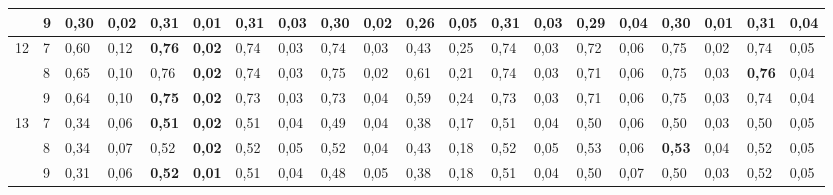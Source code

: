\documentclass[conference]{IEEEtran}
\begin{document}
\begin{table*}[]
\begin{tabular}{|cl|ll|ll|ll|ll|ll|ll|ll|ll|ll|}
		\multicolumn{1}{|c|}{} & 9 & \multicolumn{1}{l|}{0,30} & 0,02 & \multicolumn{1}{l|}{0,31} & \textbf{0,01} & \multicolumn{1}{l|}{\textbf{0,31}} & 0,03 & \multicolumn{1}{l|}{0,30} & 0,02 & \multicolumn{1}{l|}{0,26} & 0,05 & \multicolumn{1}{l|}{\textbf{0,31}} & 0,03 & \multicolumn{1}{l|}{0,29} & 0,04 & \multicolumn{1}{l|}{0,30} & 0,01 & \multicolumn{1}{l|}{0,31} & 0,04 \\ \hline
		\multicolumn{1}{|c|}{\multirow{3}{*}{12}} & 7 & \multicolumn{1}{l|}{0,60} & 0,12 & \multicolumn{1}{l|}{\textbf{0,76}} & \textbf{0,02} & \multicolumn{1}{l|}{0,74} & 0,03 & \multicolumn{1}{l|}{0,74} & 0,03 & \multicolumn{1}{l|}{0,43} & 0,25 & \multicolumn{1}{l|}{0,74} & 0,03 & \multicolumn{1}{l|}{0,72} & 0,06 & \multicolumn{1}{l|}{0,75} & 0,02 & \multicolumn{1}{l|}{0,74} & 0,05 \\ \cline{2-20} 
		\multicolumn{1}{|c|}{} & 8 & \multicolumn{1}{l|}{0,65} & 0,10 & \multicolumn{1}{l|}{0,76} & \textbf{0,02} & \multicolumn{1}{l|}{0,74} & 0,03 & \multicolumn{1}{l|}{0,75} & 0,02 & \multicolumn{1}{l|}{0,61} & 0,21 & \multicolumn{1}{l|}{0,74} & 0,03 & \multicolumn{1}{l|}{0,71} & 0,06 & \multicolumn{1}{l|}{0,75} & 0,03 & \multicolumn{1}{l|}{\textbf{0,76}} & 0,04 \\ \cline{2-20} 
		\multicolumn{1}{|c|}{} & 9 & \multicolumn{1}{l|}{0,64} & 0,10 & \multicolumn{1}{l|}{\textbf{0,75}} & \textbf{0,02} & \multicolumn{1}{l|}{0,73} & 0,03 & \multicolumn{1}{l|}{0,73} & 0,04 & \multicolumn{1}{l|}{0,59} & 0,24 & \multicolumn{1}{l|}{0,73} & 0,03 & \multicolumn{1}{l|}{0,71} & 0,06 & \multicolumn{1}{l|}{0,75} & 0,03 & \multicolumn{1}{l|}{0,74} & 0,04 \\ \hline
		\multicolumn{1}{|c|}{\multirow{3}{*}{13}} & 7 & \multicolumn{1}{l|}{0,34} & 0,06 & \multicolumn{1}{l|}{\textbf{0,51}} & \textbf{0,02} & \multicolumn{1}{l|}{0,51} & 0,04 & \multicolumn{1}{l|}{0,49} & 0,04 & \multicolumn{1}{l|}{0,38} & 0,17 & \multicolumn{1}{l|}{0,51} & 0,04 & \multicolumn{1}{l|}{0,50} & 0,06 & \multicolumn{1}{l|}{0,50} & 0,03 & \multicolumn{1}{l|}{0,50} & 0,05 \\ \cline{2-20} 
		\multicolumn{1}{|c|}{} & 8 & \multicolumn{1}{l|}{0,34} & 0,07 & \multicolumn{1}{l|}{0,52} & \textbf{0,02} & \multicolumn{1}{l|}{0,52} & 0,05 & \multicolumn{1}{l|}{0,52} & 0,04 & \multicolumn{1}{l|}{0,43} & 0,18 & \multicolumn{1}{l|}{0,52} & 0,05 & \multicolumn{1}{l|}{0,53} & 0,06 & \multicolumn{1}{l|}{\textbf{0,53}} & 0,04 & \multicolumn{1}{l|}{0,52} & 0,05 \\ \cline{2-20} 
		\multicolumn{1}{|c|}{} & 9 & \multicolumn{1}{l|}{0,31} & 0,06 & \multicolumn{1}{l|}{\textbf{0,52}} & \textbf{0,01} & \multicolumn{1}{l|}{0,51} & 0,04 & \multicolumn{1}{l|}{0,48} & 0,05 & \multicolumn{1}{l|}{0,38} & 0,18 & \multicolumn{1}{l|}{0,51} & 0,04 & \multicolumn{1}{l|}{0,50} & 0,07 & \multicolumn{1}{l|}{0,50} & 0,03 & \multicolumn{1}{l|}{0,52} & 0,05 \\ \hline

\end{tabular}
\end{table*}
\end{document}
